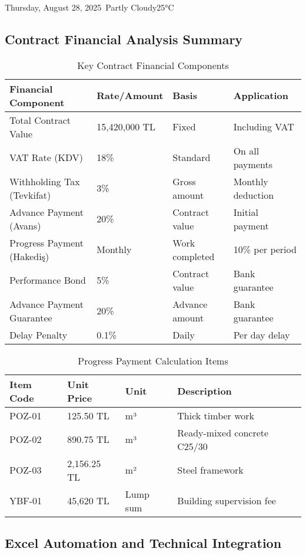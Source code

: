 \begin{dailyentry}{Thursday, August 28, 2025}{\weathercloudy\ Partly Cloudy}{25°C}
\subsection*{Contract Financial Analysis Summary}

\begin{table}[ht]
\centering
\caption{Key Contract Financial Components}
\begin{tabular}{@{}p{4.2cm}p{2.8cm}p{2.8cm}p{2.8cm}@{}}
\toprule
\textbf{Financial Component} & \textbf{Rate/Amount} & \textbf{Basis} & \textbf{Application} \\
\midrule
Total Contract Value & 15,420,000 TL & Fixed & Including VAT \\
VAT Rate (KDV) & 18\% & Standard & On all payments \\
Withholding Tax (Tevkifat) & 3\% & Gross amount & Monthly deduction \\
Advance Payment (Avans) & 20\% & Contract value & Initial payment \\
Progress Payment (Hakediş) & Monthly & Work completed & 10\% per period \\
\midrule
Performance Bond & 5\% & Contract value & Bank guarantee \\
Advance Payment Guarantee & 20\% & Advance amount & Bank guarantee \\
Delay Penalty & 0.1\% & Daily & Per day delay \\
\bottomrule
\end{tabular}
\end{table}

\begin{table}[ht]
\centering
\caption{Progress Payment Calculation Items}
\begin{tabular}{@{}p{3cm}p{2.5cm}p{2.5cm}p{4cm}@{}}
\toprule
\textbf{Item Code} & \textbf{Unit Price} & \textbf{Unit} & \textbf{Description} \\
\midrule
POZ-01 & 125.50 TL & m³ & Thick timber work \\
POZ-02 & 890.75 TL & m³ & Ready-mixed concrete C25/30 \\
POZ-03 & 2,156.25 TL & m² & Steel framework \\
YBF-01 & 45,620 TL & Lump sum & Building supervision fee \\
\bottomrule
\end{tabular}
\end{table}

\vspace{1cm}

\subsection*{Excel Automation and Technical Integration}


\end{dailyentry}
